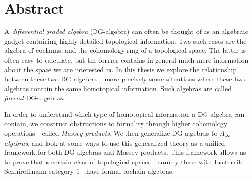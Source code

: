 

\section{Abstract}

A \textit{differential graded algebra} (DG-algebra) can often be thought of as an algebraic gadget containing highly detailed topological information. Two such cases are the algebra of cochains, and the cohomology ring of a topological space. The latter is often easy to calculate, but the former contains in general much more information about the space we are interested in. In this thesis we explore the relationship between these two DG-algebras---more precisely some situations where these two algebras contain the same homotopical information. Such algebras are called \textit{formal} DG-algebras.

In order to understand which type of homotopical information a DG-algebra can contain, we construct obstructions to formality through higher cohomology operations---called \textit{Massey products}. We then generalize DG-algebras to \textit{$A_{\infty}$-algebras}, and look at some ways to use this generalized theory as a unified framework for both DG-algebras and Massey products. This framework allows us to prove that a certain class of topological spaces---namely those with Lusternik-Schnirellmann category $1$---have formal cochain algebras. 